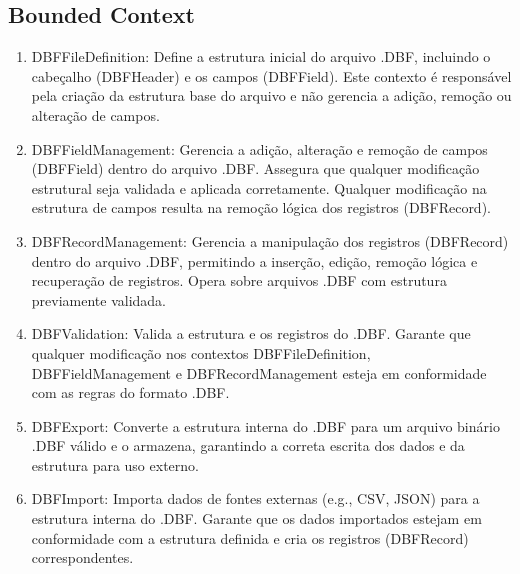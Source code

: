\begin{titlepage}
    \subsection{Bounded Context}

    \begin{enumerate}
        \item   DBFFileDefinition: Define a estrutura inicial do arquivo .DBF, incluindo o
              cabeçalho (DBFHeader) e os campos (DBFField). Este contexto é responsável pela
              criação da estrutura base do arquivo e não gerencia a adição, remoção ou
              alteração de campos.
        \item   DBFFieldManagement: Gerencia a adição, alteração e remoção de campos (DBFField)
              dentro do arquivo .DBF. Assegura que qualquer modificação estrutural seja
              validada e aplicada corretamente. Qualquer modificação na estrutura de campos
              resulta na remoção lógica dos registros (DBFRecord).
        \item   DBFRecordManagement: Gerencia a manipulação dos registros (DBFRecord) dentro do
              arquivo .DBF, permitindo a inserção, edição, remoção lógica e recuperação de
              registros. Opera sobre arquivos .DBF com estrutura previamente validada.
        \item   DBFValidation: Valida a estrutura e os registros do .DBF. Garante que qualquer
              modificação nos contextos DBFFileDefinition, DBFFieldManagement e
              DBFRecordManagement esteja em conformidade com as regras do formato .DBF.
        \item   DBFExport: Converte a estrutura interna do .DBF para um arquivo binário .DBF
              válido e o armazena, garantindo a correta escrita dos dados e da estrutura para
              uso externo.
        \item   DBFImport: Importa dados de fontes externas (e.g., CSV, JSON) para a estrutura
              interna do .DBF. Garante que os dados importados estejam em conformidade com a
              estrutura definida e cria os registros (DBFRecord) correspondentes.
    \end{enumerate}

    
    
    
\end{titlepage}